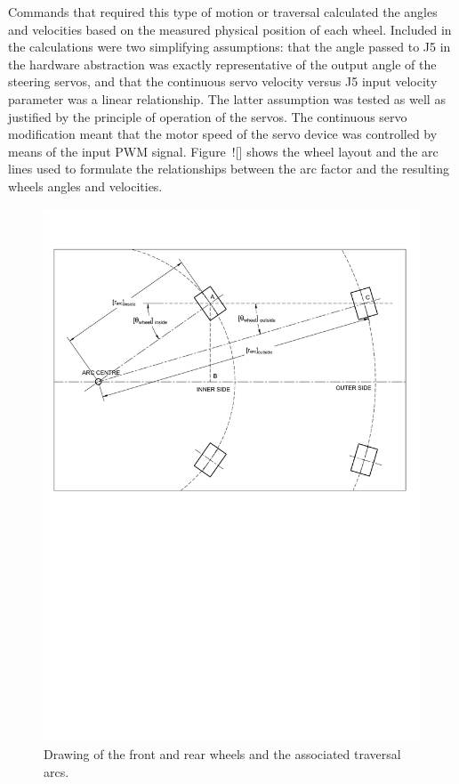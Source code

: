        Commands that required this type of motion or traversal calculated the angles and velocities based on the measured physical position of each wheel. Included in the calculations were two simplifying assumptions: that the angle passed to J5 in the hardware abstraction was exactly representative of the output angle of the steering servos, and that the continuous servo velocity versus J5 input velocity parameter was a linear relationship. The latter assumption was tested as well as justified by the principle of operation of the servos. The continuous servo modification meant that the motor speed of the servo device was controlled by means of the input PWM signal. Figure~![] shows the wheel layout and the arc lines used to formulate the relationships between the arc factor and the resulting wheels angles and velocities.
        
        \begin{figure}[h!]
          \centering
          \includegraphics[clip, trim=1cm 14cm 1cm 3cm,width=1\linewidth]{figures/arcCalculations}
          \caption[Drawing of the front and rear wheels and the associated traversal arcs.]{Drawing of the front and rear wheels and the associated traversal arcs.}
          \label{fig:softDev-arcCalculations}
        \end{figure}
        
